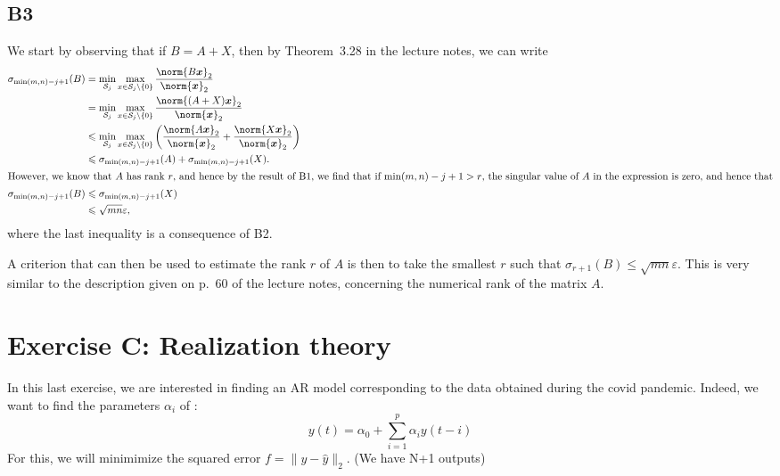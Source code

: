 \documentclass[11pt]{article}
\newcommand{\snorm}[1]{\norm{#1}_2} %
\begin{document}
\subsection*{B3}
We start by observing that if \(B = A + X\), then by Theorem~3.28 in the lecture notes, we can write
\begin{align*}
\sigma_{\min(m, n) - j + 1}(B) &= \min_{\mathcal{S}_j} \max_{x \in \mathcal{S}_j \setminus \{0\}} \frac{\snorm{B\bm{x}}}{\snorm{\bm{x}}}\\
&= \min_{\mathcal{S}_j} \max_{x \in \mathcal{S}_j \setminus \{0\}} \frac{\snorm{(A + X)\bm{x}}}{\snorm{\bm{x}}}\\
&\leqslant\min_{\mathcal{S}_j} \max_{x \in \mathcal{S}_j \setminus \{0\}} \left(\frac{\snorm{A\bm{x}}}{\snorm{\bm{x}}} + \frac{\snorm{X\bm{x}}}{\snorm{\bm{x}}}\right)\\
&\leqslant \sigma_{\min(m, n) - j + 1}(A) + \sigma_{\min(m, n) - j + 1}(X).\\
\intertext{However, we know that \(A\) has rank \(r\), and hence by the result of B1, we find that if \(\min(m, n) - j + 1 > r\), the singular value of \(A\) in the expression is zero, and hence that}
\sigma_{\min(m, n) - j + 1}(B) &\leqslant \sigma_{\min(m, n) - j + 1}(X)\\
&\leqslant \sqrt{mn} \varepsilon,
\end{align*}
where the last inequality is a consequence of B2.

A criterion that can then be used to estimate the rank \(r\) of \(A\) is then to take the smallest \(r\) such that \(\sigma_{r + 1}(B) \leqslant \sqrt{mn} \varepsilon\).
This is very similar to the description given on p.~60 of the lecture notes, concerning the numerical rank of the matrix \(A\). 

\section*{Exercise C: Realization theory}

In this last exercise, we are interested in finding an AR model corresponding to the data obtained during the covid pandemic. Indeed, we want to find the parameters $\alpha_i$ of :
\[y(t) = \alpha_0 + \sum_{i=1}^p \alpha_iy(t-i)
\]
For this, we will minimimize the squared error $f = \|y-\hat{y} \|_2$. (We have N+1 outputs)
\end{document}
